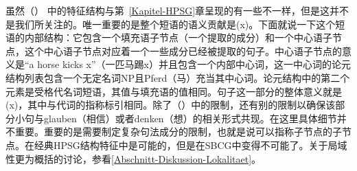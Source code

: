 \begin{figure}
\eanoraggedright
{}
\z
\vspace{-\baselineskip}
\end{figure}%
虽然（） 中的特征结构与第~\ref{Kapitel-HPSG}章呈现的有一些不一样，但是这并不是我们所关注的。唯一重要的是整个短语的语义贡献是(x)。下面就说一下这个短语的内部结构：它包含一个填充语子节点（一个提取的成分）和一个中心语子节点，这个中心语子节点对应着一个一些成分已经被提取的句子。中心语子节点的意义是“a horse kicks x”（一匹马踢x）并且包含一个内部中心词，这一中心词的论元结构列表包含一个无定名词NP且Pferd（马）充当其中心词。论元结构中的第二个元素是受格代名词短语，其\localc 值与填充语的\localc 值相同。句子这一部分的整体意义就是 (x)，其中与代词的指称标引相同。除了（）中的限制，还有别的限制以确保该部分小句与glauben（相信）或者denken（想）的相关形式共现。在这里具体细节并不重要。重要的是需要制定复杂句法成分的限制，也就是说可以指称子节点的子节点。在经典HPSG结构特征中是可能的，但是在SBCG中变得不可能了。关于局域性更为概括的讨论，参看\ref{Abschnitt-Diskussion-Lokalitaet}。
